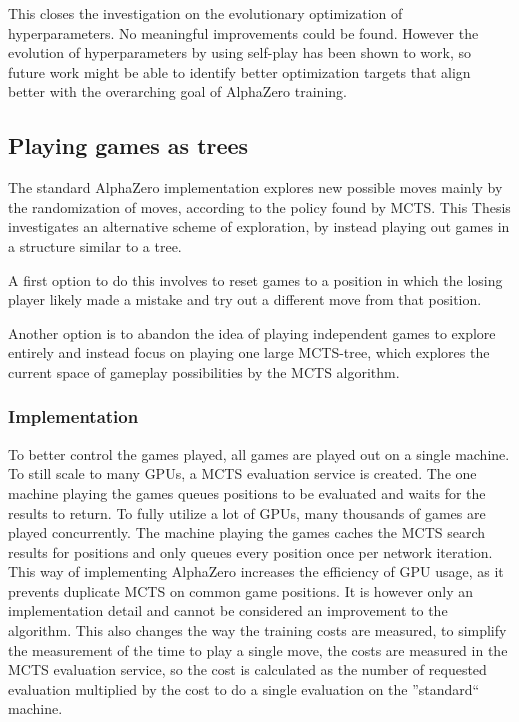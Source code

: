 \documentclass[12pt,onecolumn,oneside,titlepage]{article}
\begin{document}
This closes the investigation on the evolutionary optimization of hyperparameters. No meaningful improvements could be found. However the evolution of hyperparameters by using self-play has been shown to work,
so future work might be able to identify better optimization targets that align better with the overarching goal of AlphaZero training.


\subsection{Playing games as trees}

The standard AlphaZero implementation explores new possible moves mainly by the randomization of moves, according to the policy found by MCTS.
This Thesis investigates an alternative scheme of exploration, by instead playing out games in a structure similar to a tree.

A first option to do this involves to reset games to a position in which the losing player likely made a mistake and try out a different move from that position.

Another option is to abandon the idea of playing independent games to explore entirely and instead focus on playing one large MCTS-tree, which explores the current space of gameplay possibilities by the MCTS algorithm.

\subsubsection{Implementation}

To better control the games played, all games are played out on a single machine. To still scale to many GPUs, a MCTS evaluation service is created. The one machine playing the games queues positions to be evaluated and waits for
the results to return. To fully utilize a lot of GPUs, many thousands of games are played concurrently. The machine playing the games caches the MCTS search results for positions and only queues every position once per network iteration. This 
way of implementing AlphaZero increases the efficiency of GPU usage, as it prevents duplicate MCTS on common game positions. It is however only an implementation detail and cannot be considered an improvement to the algorithm.
This also changes the way the training costs are measured, to simplify the measurement of the time to play a single move, the costs are measured in the MCTS evaluation service, so the cost is calculated as the number of requested evaluation multiplied
by the cost to do a single evaluation on the ''standard`` machine.
\end{document}
